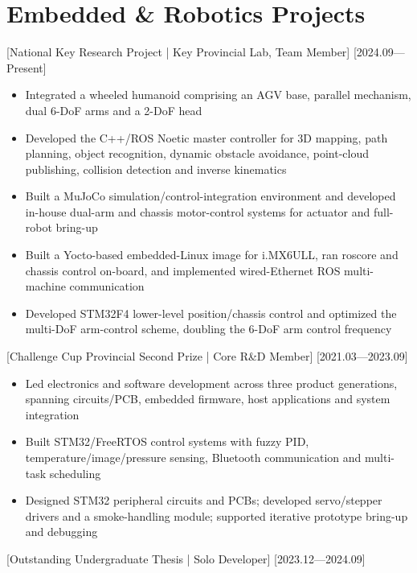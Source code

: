 \documentclass{resume-photo}
\begin{document}
\section{Embedded \& Robotics Projects}

[\textnormal{National Key Research Project | Key Provincial Lab, Team Member}]
[2024.09—Present]

\begin{itemize}
  \item Integrated a wheeled humanoid comprising an AGV base, parallel mechanism, dual 6-DoF arms and a 2-DoF head
  \item Developed the C++/ROS Noetic master controller for 3D mapping, path planning, object recognition, dynamic obstacle avoidance, point-cloud publishing, collision detection and inverse kinematics
  \item Built a MuJoCo simulation/control-integration environment and developed in-house dual-arm and chassis motor-control systems for actuator and full-robot bring-up
  \item Built a Yocto-based embedded-Linux image for i.MX6ULL, ran roscore and chassis control on-board, and implemented wired-Ethernet ROS multi-machine communication
  \item Developed STM32F4 lower-level position/chassis control and optimized the multi-DoF arm-control scheme, doubling the 6-DoF arm control frequency
\end{itemize}

[\textnormal{Challenge Cup Provincial Second Prize | Core R\&D Member}]
[2021.03—2023.09]

\begin{itemize}
  \item Led electronics and software development across three product generations, spanning circuits/PCB, embedded firmware, host applications and system integration
  \item Built STM32/FreeRTOS control systems with fuzzy PID, temperature/image/pressure sensing, Bluetooth communication and multi-task scheduling
  \item Designed STM32 peripheral circuits and PCBs; developed servo/stepper drivers and a smoke-handling module; supported iterative prototype bring-up and debugging
\end{itemize}

[\textnormal{Outstanding Undergraduate Thesis | Solo Developer}]
[2023.12—2024.09]
\end{document}
